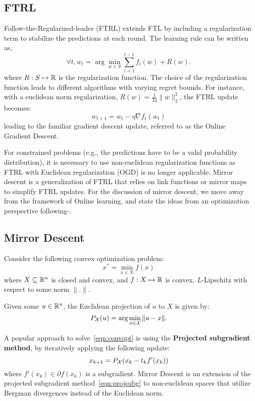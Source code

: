 \subsection{FTRL}\label{sec:ftrl}
Follow-the-Regularized-leader (FTRL) extends FTL by including a regularization term to stabilize
the predictions at each round.
The learning rule can be written as, $$\forall t, w_t = \arg \min_{w \in S} \sum_{i=1}^{t-1} f_i(w)
	+ R(w).
$$
where $R: S \mapsto \mathbb{R}$ is the regularization function.
The choice of the regularization function leads to different algorithms with varying regret bounds.
For instance, with a euclidean norm regularization, $R(w) = \frac{1}{2 \eta} \|w\|_2^2$, the FTRL
update becomes:
\begin{equation}
	w_{t+1} = w_t - \eta \nabla f_t(w_t)
\end{equation} leading to the
familiar gradient descent update, referred to as the Online Gradient Descent.

For constrained problems (e.g., the predictions have to be a valid probability distribution), it is
necessary to use non-euclidean regularization functions as FTRL with Euclidean regularization (OGD)
is no longer applicable.
Mirror descent is a generalization of FTRL that relies on link functions or mirror maps to simplify
FTRL updates.
For the discussion of mirror descent, we move away from the framework of Online learning, and state
the ideas from an optimization perspective following-\cite{beckMirror2003a,beckFirstOrder2017}.

\subsection{Mirror Descent}
Consider the following convex optimization problem:
\begin{equation}
	\label{eqn:convopt} x^{\ast} =
	\min_{x \in X} f(x)
\end{equation} where $X \subseteq \mathbb{R}^n$ is closed and convex, and $f: X \mapsto
	\mathbb{R}$ is convex, $L$-Lipschitz with respect to some norm $\|.
	\|$.

Given some $u \in \mathbb{R}^n$, the Euclidean projection of $u$ to $X$ is given by:
\begin{equation}
	\label{eqn:eucproj} P_{\mathcal{X}}(u) = \arg \min_{x \in \mathcal{X}} \| u - x \|.
\end{equation}

A popular approach to solve~\ref{eqn:convopt} is using the \textbf{Projected subgradient method},
by iteratively applying the following update:
\begin{equation}
	\label{eqn:projsubg} x_{k+1} =
	P_{\mathcal{X}}(x_k - t_k f'(x_k))
\end{equation} where $f'(x_k) \in \partial f(x_k)$ is a subgradient.
Mirror Descent is an extension of the projected subgradient method~\ref{eqn:projsubg} to
non-euclidean spaces that utilize Bergman divergences instead of the Euclidean norm.

